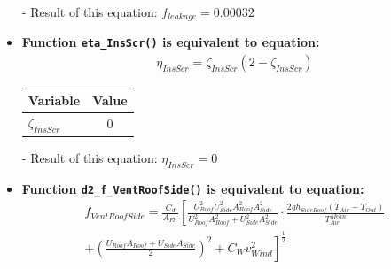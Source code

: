 \documentclass[a4paper]{article}
\numberwithin{equation}{section}
\begin{document}
\begin{itemize}
  \item[-] Result of this equation: \(f_{leakage} = 0.00032\)

  \item \textbf{Function \texttt{eta\_InsScr()} is equivalent to equation:}
        \begin{align*}
          \eta_{InsScr} = \zeta_{InsScr} (2 -  \zeta_{InsScr})
        \end{align*}

        \begin{table}[H]
          \centering
          \begin{tabular}{@{}lS@{}}
            \toprule
            \textbf{Variable}  & \textbf{Value} \\
            \midrule
            \(\zeta_{InsScr}\) & 0              \\
            \bottomrule
          \end{tabular}
        \end{table}

  \item[-] Result of this equation: \(\eta_{InsScr} = 0\)

  \item \textbf{Function \texttt{d2\_f\_VentRoofSide()} is equivalent to equation:}
        \begin{align*}
          f_{VentRoofSide} = \frac{C_d}{A_{Flr}} \left[\frac{U_{Roof}^2 U_{Side}^2 A_{Roof}^2 A_{Side}^2}{U_{Roof}^2 A_{Roof}^2 + U_{Side}^2 A_{Side}^2} \cdot \frac{2gh_{SideRoof} (T_{Air} - T_{Out})}{T_{Air}^{Mean}}\right. \\
          + \left.{ \left(\frac{U_{Roof} A_{Roof} + U_{Side} A_{Side}}{2}\right)}^2 + C_W v_{Wind}^2\right]^{\frac{1}{2}}
        \end{align*}


\end{itemize}
\end{document}
